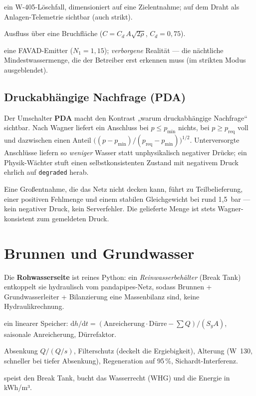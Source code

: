 \documentclass[11pt,a4paper,parskip=half]{scrreprt}
\newcommand{\ui}[1]{\textsf{\bfseries #1}}      %
\begin{document}
\begin{description}[leftmargin=1.2em]
\item[Hydrant] ein W-405-Löschfall, dimensioniert auf eine Zielentnahme; auf dem
  Draht als Anlagen-Telemetrie sichtbar (auch strikt).
\item[Rohrbruch] Ausfluss über eine Bruchfläche ($C=C_d\,A\sqrt{2\rho}$, $C_d=0{,}75$).
\item[Leckage] eine FAVAD-Emitter ($N_1=1{,}15$); \emph{verborgene} Realität — die
  nächtliche Mindestwassermenge, die der Betreiber erst erkennen muss (im strikten
  Modus ausgeblendet).
\end{description}

\section{Druckabhängige Nachfrage (PDA)}
Der Umschalter \ui{PDA} macht den Kontrast „warum druckabhängige Nachfrage“
sichtbar. Nach Wagner liefert ein Anschluss bei $p\le p_{\min}$ nichts, bei
$p\ge p_{\text{req}}$ voll und dazwischen einen Anteil
$\bigl((p-p_{\min})/(p_{\text{req}}-p_{\min})\bigr)^{1/2}$. Unterversorgte
Anschlüsse liefern so \emph{weniger} Wasser statt unphysikalisch negativer Drücke;
ein Physik-Wächter stuft einen selbstkonsistenten Zustand mit negativem Druck
ehrlich auf \texttt{degraded} herab.

\begin{beispiel}
Eine Großentnahme, die das Netz nicht decken kann, führt zu Teilbelieferung, einer
positiven Fehlmenge und einem stabilen Gleichgewicht bei rund 1{,}5~bar — kein
negativer Druck, kein Serverfehler. Die gelieferte Menge ist stets
Wagner-konsistent zum gemeldeten Druck.
\end{beispiel}

\chapter{Brunnen und Grundwasser}
\label{ch:brunnen}

Die \textbf{Rohwasserseite} ist reines Python: ein \emph{Reinwasserbehälter}
(Break Tank) entkoppelt sie hydraulisch vom pandapipes-Netz, sodass Brunnen +
Grundwasserleiter + Bilanzierung eine Massenbilanz sind, keine Hydraulikrechnung.

\begin{description}[leftmargin=1.2em]
\item[Grundwasserleiter] ein linearer Speicher: $\mathrm{d}h/\mathrm{d}t =
  (\text{Anreicherung}\cdot\text{Dürre} - \sum Q)/(S_y A)$, saisonale
  Anreicherung, Dürrefaktor.
\item[Brunnen] Absenkung $Q/(Q/s)$, Filterschutz (deckelt die Ergiebigkeit),
  Alterung (W~130, schneller bei tiefer Absenkung), Regeneration auf 95\,\%,
  Sichardt-Interferenz.
\item[Brunnenfeld] speist den Break Tank, bucht das Wasserrecht (WHG) und die
  Energie in kWh/m³.
\end{description}
\end{document}
